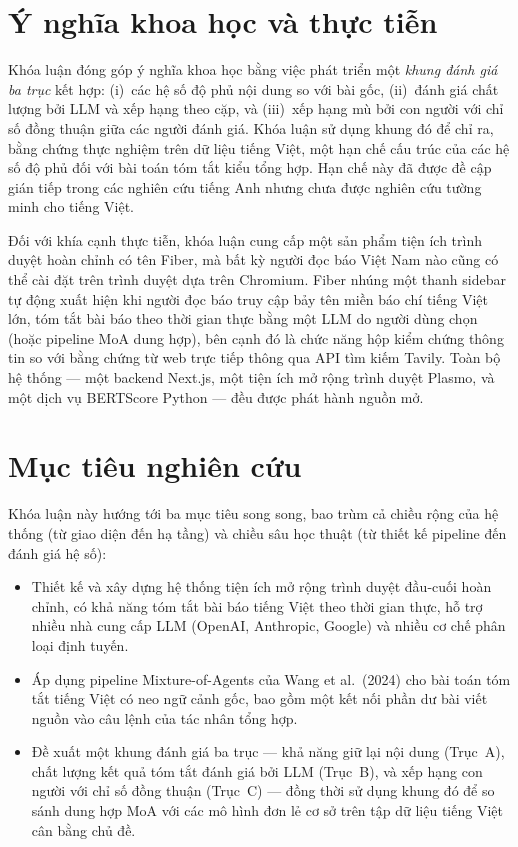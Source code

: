 \section*{Ý nghĩa khoa học và thực tiễn}

Khóa luận đóng góp ý nghĩa khoa học bằng việc phát triển một \textit{khung đánh giá ba trục} kết hợp: (i)~các hệ số độ phủ
nội dung so với bài gốc, (ii)~đánh giá chất lượng bởi LLM và xếp hạng theo
cặp, và (iii)~xếp hạng mù bởi con người với chỉ số đồng thuận giữa các người đánh giá.
Khóa luận sử dụng khung đó để chỉ ra, bằng chứng thực nghiệm trên dữ liệu tiếng
Việt, một hạn chế cấu trúc của các hệ số độ phủ đối với bài toán tóm tắt kiểu tổng
hợp. Hạn chế này đã được đề cập gián tiếp trong các nghiên cứu tiếng Anh
\cite{Wang2024,Zheng2023} nhưng chưa được nghiên cứu tường minh cho tiếng Việt.

Đối với khía cạnh thực tiễn, khóa luận cung cấp một sản phẩm tiện ích trình duyệt hoàn chỉnh có tên Fiber, mà bất
kỳ người đọc báo Việt Nam nào cũng có thể cài đặt trên trình duyệt dựa trên Chromium.
Fiber nhúng một thanh sidebar tự động xuất hiện khi người đọc báo truy cập bảy tên miền báo chí tiếng Việt lớn, tóm tắt bài
báo theo thời gian thực bằng một LLM do người dùng chọn (hoặc pipeline MoA dung hợp),
bên cạnh đó là chức năng hộp kiểm chứng thông tin so với bằng chứng từ web trực tiếp thông qua API tìm kiếm
Tavily. Toàn bộ hệ thống --- một backend Next.js, một tiện ích mở rộng trình duyệt
Plasmo, và một dịch vụ BERTScore Python --- đều được phát hành nguồn mở.

\section*{Mục tiêu nghiên cứu}

Khóa luận này hướng tới ba mục tiêu song song, bao trùm cả chiều rộng của hệ thống (từ giao diện đến hạ tầng) và chiều sâu học thuật (từ thiết kế pipeline đến đánh giá hệ số):

\begin{itemize}
  \item Thiết kế và xây dựng hệ thống tiện ích mở rộng trình duyệt đầu-cuối hoàn
        chỉnh, có khả năng tóm tắt bài báo tiếng Việt theo thời gian
        thực, hỗ trợ nhiều nhà cung cấp LLM (OpenAI, Anthropic, Google) và nhiều cơ chế
        phân loại định tuyến.
  \item Áp dụng pipeline Mixture-of-Agents của Wang et al.\ (2024) cho bài toán
        tóm tắt tiếng Việt có neo ngữ cảnh gốc, bao gồm một kết nối phần dư bài
        viết nguồn vào câu lệnh của tác nhân tổng hợp.
  \item Đề xuất một khung đánh giá ba trục --- khả năng giữ lại nội dung
        (Trục~A), chất lượng kết quả tóm tắt đánh giá bởi LLM (Trục~B), và xếp hạng
        con người với chỉ số đồng thuận (Trục~C) --- đồng thời sử dụng khung đó
        để so sánh dung hợp MoA với các mô hình đơn lẻ cơ sở trên tập dữ liệu
        tiếng Việt cân bằng chủ đề.
\end{itemize}


